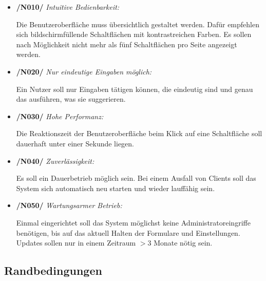 \begin{itemize}
    \item \textbf{/N010/} \textit{Intuitive Bedienbarkeit:} \par
    Die Benutzeroberfläche muss übersichtlich gestaltet werden. Dafür empfehlen sich bildschirmfüllende Schaltflächen mit kontrastreichen Farben. Es sollen nach Möglichkeit nicht mehr als fünf Schaltflächen pro Seite angezeigt werden. 
    
    \item \textbf{/N020/} \textit{Nur eindeutige Eingaben möglich:} \par
    Ein Nutzer soll nur Eingaben tätigen können, die eindeutig sind und genau das ausführen, was sie suggerieren.
    
    \item \textbf{/N030/} \textit{Hohe Performanz:} \par
    Die Reaktionszeit der Benutzeroberfläche beim Klick auf eine Schaltfläche soll dauerhaft unter einer Sekunde liegen.
    
    \item \textbf{/N040/} \textit{Zuverlässigkeit:} \par
    Es soll ein Dauerbetrieb möglich sein. Bei einem Ausfall von Clients soll das System sich automatisch neu starten und wieder lauffähig sein.
    
    \item \textbf{/N050/} \textit{Wartungsarmer Betrieb:} \par
    Einmal eingerichtet soll das System möglichst keine Administratoreingriffe benötigen, bis auf das aktuell Halten der Formulare und Einstellungen. Updates sollen nur in einem Zeitraum $> 3$ Monate nötig sein.
\end{itemize}{}
\newpage
\subsection{Randbedingungen}

